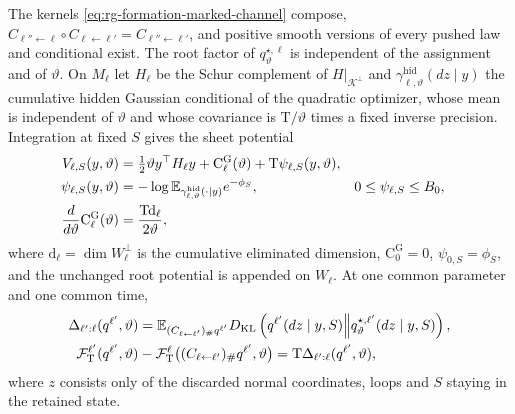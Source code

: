 The kernels \cref{eq:rg-formation-marked-channel} compose,
\(C_{\ell''\leftarrow\ell}\circ C_{\ell\leftarrow\ell'}=C_{\ell''\leftarrow\ell'}\),
and positive smooth versions of every pushed law and conditional exist. The
root factor of \(q^{\star,\ell}_\vartheta\) is independent of the assignment
and of \(\vartheta\). On \(M_\ell\) let \(H_\ell\) be the Schur complement of
\(H|_{\mathcal K^\perp}\) and \(\gamma^{\mathrm{hid}}_{\ell,\vartheta}(dz\mid y)\)
the cumulative hidden Gaussian conditional of the quadratic optimizer, whose
mean is independent of \(\vartheta\) and whose covariance is
\(\mathrm T/\vartheta\) times a fixed inverse precision. Integration at fixed
\(S\) gives the sheet potential
\begin{equation}
\begin{aligned}
V_{\ell,S}(y,\vartheta)
 &=\tfrac12\vartheta y^\top H_\ell y+\mathrm C_\ell^{\mathrm G}(\vartheta)
       +\mathrm T\psi_{\ell,S}(y,\vartheta),\\
\psi_{\ell,S}(y,\vartheta)
 &=-\log\mathbb E_{\gamma^{\mathrm{hid}}_{\ell,\vartheta}(\cdot\mid y)}
                  e^{-\phi_S},&
0&\le\psi_{\ell,S}\le B_0,\\
\frac{d}{d\vartheta}\mathrm C_\ell^{\mathrm G}(\vartheta)
 &=\frac{\mathrm T \mathrm d_\ell}{2\vartheta},
\end{aligned}
\label{eq:rg-formation-parent-potential}
\end{equation}
where \(\mathrm d_\ell=\dim W_\ell^\perp\) is the cumulative eliminated
dimension, \(\mathrm C_0^{\mathrm G}=0\), \(\psi_{0,S}=\phi_S\), and the
unchanged root potential is appended on \(W_\ell\). At one common parameter
and one common time,
\begin{equation}
\begin{aligned}
\Delta_{\ell':\ell}(q^{\ell'},\vartheta)
 &=\mathbb E_{(C_{\ell\leftarrow\ell'})_\#q^{\ell'}}
   D_{\mathrm{KL}}\left(q^{\ell'}(dz\mid y,S)
        \middle\Vert q^{\star,\ell'}_\vartheta(dz\mid y,S)\right),\\
\mathcal F_{\mathrm T}^{\ell'}(q^{\ell'},\vartheta)
 &-\mathcal F_{\mathrm T}^\ell\bigl((C_{\ell\leftarrow\ell'})_\#q^{\ell'},\vartheta\bigr)
   =\mathrm T\Delta_{\ell':\ell}(q^{\ell'},\vartheta),
\end{aligned}
\label{eq:rg-formation-conditional-cost}
\end{equation}
where \(z\) consists only of the discarded normal coordinates, loops and
\(S\) staying in the retained state. 

